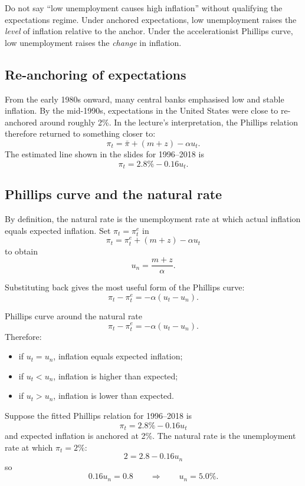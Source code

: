 \documentclass[12pt]{article}
\begin{document}
\begin{commonmistake}
Do not say ``low unemployment causes high inflation'' without qualifying the expectations regime. Under anchored expectations, low unemployment raises the \emph{level} of inflation relative to the anchor. Under the accelerationist Phillips curve, low unemployment raises the \emph{change} in inflation.
\end{commonmistake}

\subsection{Re-anchoring of expectations}

From the early 1980s onward, many central banks emphasised low and stable inflation. By the mid-1990s, expectations in the United States were close to re-anchored around roughly 2\%. In the lecture's interpretation, the Phillips relation therefore returned to something closer to:
\[
\pi_t=\bar{\pi}+(m+z)-\alpha u_t.
\]
The estimated line shown in the slides for 1996--2018 is
\[
\pi_t=2.8\%-0.16u_t.
\]

\subsection{Phillips curve and the natural rate}

By definition, the natural rate is the unemployment rate at which actual inflation equals expected inflation. Set $\pi_t=\pi_t^e$ in
\[
\pi_t=\pi_t^e+(m+z)-\alpha u_t
\]
to obtain
\[
u_n=\frac{m+z}{\alpha}.
\]

Substituting back gives the most useful form of the Phillips curve:
\[
\pi_t-\pi_t^e=-\alpha(u_t-u_n).
\]

\begin{theorem}{Phillips curve around the natural rate}{}
\[
\pi_t-\pi_t^e=-\alpha(u_t-u_n).
\]
Therefore:
\begin{itemize}[leftmargin=1.5em]
\item if $u_t=u_n$, inflation equals expected inflation;
\item if $u_t<u_n$, inflation is higher than expected;
\item if $u_t>u_n$, inflation is lower than expected.
\end{itemize}
\end{theorem}

\begin{examplebox}[title={Worked Example: Rough estimate of the natural rate}]
Suppose the fitted Phillips relation for 1996--2018 is
\[
\pi_t=2.8\%-0.16u_t
\]
and expected inflation is anchored at 2\%. The natural rate is the unemployment rate at which $\pi_t=2\%$:
\[
2 = 2.8 - 0.16u_n
\]
so
\[
0.16u_n=0.8
\qquad\Rightarrow\qquad
u_n=5.0\%.
\]
\end{examplebox}
\end{document}

